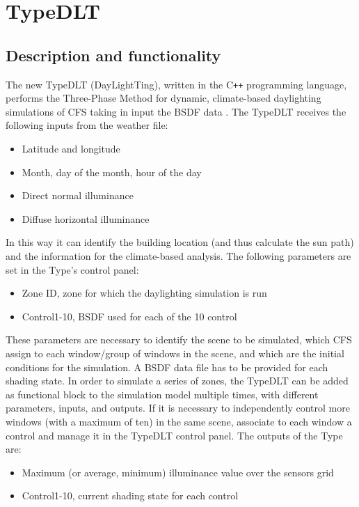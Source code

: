 \chapter{TypeDLT}
\section{Description and functionality}
The new TypeDLT (DayLightTing), written in the C\texttt{++} programming language, performs the Three-Phase Method for dynamic, climate-based daylighting simulations of CFS taking in input the BSDF data \cite{bsa}.
The TypeDLT receives the following inputs from the weather file:
\begin{itemize}
\renewcommand{\labelitemi}{\tiny$\blacksquare$}
\item Latitude and longitude
\item Month, day of the month, hour of the day
\item Direct normal illuminance
\item Diffuse horizontal illuminance
\end{itemize}
In this way it can identify the building location (and thus calculate the sun path) and the information for the climate-based analysis. The following parameters are set in the Type's control panel:
\begin{itemize}
\renewcommand{\labelitemi}{\tiny$\blacksquare$}
\item Zone ID, zone for which the daylighting simulation is run
\item Control1-10, BSDF used for each of the 10 control
\end{itemize}
These parameters are necessary to identify the scene to be simulated, which CFS assign to each window/group of windows in the scene, and which are the initial conditions for the simulation. A BSDF data file has to be provided for each shading state. In order to simulate a series of zones, the TypeDLT can be added as functional block to the simulation model multiple times, with different parameters, inputs, and outputs. If it is necessary to independently control more windows (with a maximum of ten) in the same scene, associate to each window a control and manage it in the TypeDLT control panel.
The outputs of the Type are:
\begin{itemize}
\renewcommand{\labelitemi}{\tiny$\blacksquare$}
\item Maximum (or average, minimum) illuminance value over the sensors grid
\item Control1-10, current shading state for each control
\end{itemize}

